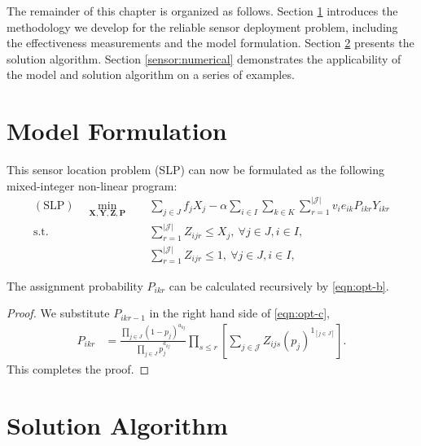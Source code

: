The remainder of this chapter is organized as follows. Section \ref{sensor:formulation} introduces the methodology we develop for the reliable sensor deployment problem, including the effectiveness measurements and the model formulation. Section \ref{sensor:algorithm} presents the solution algorithm. Section \ref{sensor:numerical} demonstrates the applicability of the model and solution algorithm on a series of examples.



\section{Model Formulation}\label{sensor:formulation}

This sensor location problem (SLP) can now be formulated as the following mixed-integer non-linear program:
\begin{subequations}
  \begin{align}
    (\text{SLP}) \quad \min_{\mathbf{X,Y,Z,P}} & \quad \sum_{j\in J} f_{j}X_{j} - \alpha\sum_{i\in I}\sum_{k\in K}\sum_{r=1}^{|\mathcal{J}|} v_{i}e_{ik}P_{ikr}Y_{ikr} \label{eqn:opt-a} \\
   \text{s.t.} & \quad \sum_{r=1}^{|\mathcal{J}|} Z_{ijr}\le X_{j}, ~\forall j\in J, i\in I, \label{eqn:opt-b} \\
   & \quad \sum_{r=1}^{|\mathcal{J}|} Z_{ijr}\le 1, ~\forall j\in J, i\in I, \label{eqn:opt-c}
  \end{align}
\end{subequations}


\begin{prop} 
  \label{prop:1}
    The assignment probability $P_{ikr}$ can be calculated recursively by \eqref{eqn:opt-b}.
\end{prop} 

\begin{proof}
  We substitute $P_{ikr-1}$ in the right hand side of \eqref{eqn:opt-c},
  \begin{align}
     P_{ikr} &= \frac{\prod_{j\in J}\left(1-p_{j}\right)^{a_{kj}}}{\prod_{j\in J}p_{j}^{a_{kj}}}\prod_{s\le r}\left[ \sum_{j\in \mathcal{J}} Z_{ijs}\left(p_{j}\right)^{1_{[j\in J]}} \right]. \label{eqn:2}
  \end{align}
  This completes the proof.
\end{proof}



\section{Solution Algorithm}\label{sensor:algorithm}
